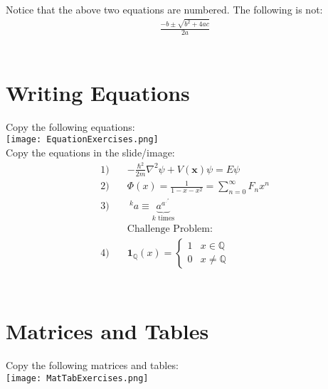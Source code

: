 \documentclass{article}
\begin{document}
Notice that the above two equations are numbered. The following is not:
\begin{align*}
    \frac{-b \pm \sqrt{b^2 + 4ac}}{2a}
\end{align*}
\\[2\baselineskip]

\newpage
\section{Writing Equations}

Copy the following equations:\\
\texttt{[image: EquationExercises.png]}
\\[2\baselineskip]

Copy the equations in the slide/image:
\begin{align*}
        1)\quad & - \frac{\hbar^2}{2m} \nabla^2 \psi + V (\mathbf{x}) \psi = E \psi \\
        2)\quad & \Phi(x) = \frac{1}{1-x-x^2} =\sum_{n=0}^{\infty}F_nx^n\\
        3)\quad & ~^k a \equiv \underbrace{a^{a^{.^{.^{a}}}}  }_{k \text{ times}}\\
        &\text{Challenge Problem:}\\
        4)\quad & \mathbf{1}_{\mathbb{Q}}(x) = \begin{cases}
            1 & x \in \mathbb{Q} \\
            0 & x \not= \mathbb{Q}
        \end{cases} \\
    \end{align*}
\\[2\baselineskip]

\newpage
\section{Matrices and Tables}

Copy the following matrices and tables:\\
\texttt{[image: MatTabExercises.png]}
\\[2\baselineskip]
\end{document}
